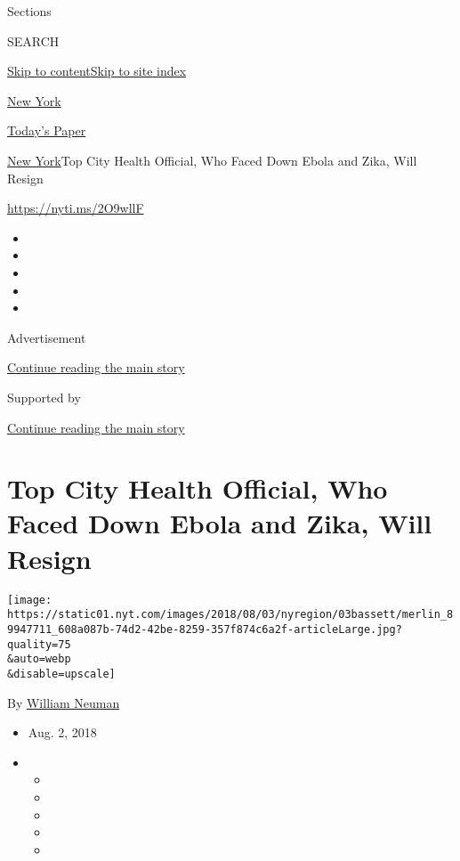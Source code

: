 Sections

SEARCH

\protect\hyperlink{site-content}{Skip to
content}\protect\hyperlink{site-index}{Skip to site index}

\href{https://www.nytimes.com/section/nyregion}{New York}

\href{https://myaccount.nytimes.com/auth/login?response_type=cookie\&client_id=vi}{}

\href{https://www.nytimes.com/section/todayspaper}{Today's Paper}

\href{/section/nyregion}{New York}\textbar{}Top City Health Official,
Who Faced Down Ebola and Zika, Will Resign

\url{https://nyti.ms/2O9wllF}

\begin{itemize}
\item
\item
\item
\item
\item
\end{itemize}

Advertisement

\protect\hyperlink{after-top}{Continue reading the main story}

Supported by

\protect\hyperlink{after-sponsor}{Continue reading the main story}

\hypertarget{top-city-health-official-who-faced-down-ebola-and-zika-will-resign}{%
\section{Top City Health Official, Who Faced Down Ebola and Zika, Will
Resign}\label{top-city-health-official-who-faced-down-ebola-and-zika-will-resign}}

\texttt{[image: https://static01.nyt.com/images/2018/08/03/nyregion/03bassett/merlin\_89947711\_608a087b-74d2-42be-8259-357f874c6a2f-articleLarge.jpg?quality=75\\\&auto=webp\\\&disable=upscale]}

By \href{https://www.nytimes.com/by/william-neuman}{William Neuman}

\begin{itemize}
\item
  Aug. 2, 2018
\item
  \begin{itemize}
  \item
  \item
  \item
  \item
  \item
  \end{itemize}
\end{itemize}

